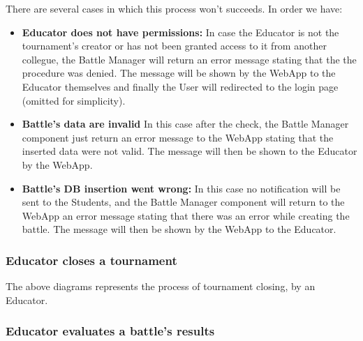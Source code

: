 \documentclass{article}
\begin{document}
{        There are several cases in which this process won't succeeds. In order we have:
        \begin{itemize}
            \item \textbf{Educator does not have permissions:} In case the Educator is not the 
            tournament's creator or has not been granted access to it from another collegue, 
            the Battle Manager will return an error message stating that the the procedure was 
            denied. 
            The message will be shown by the WebApp to the Educator themselves and finally
            the User will redirected to the login page (omitted for simplicity).
            \item \textbf{Battle's data are invalid} In this case after the check, the Battle 
            Manager component just return an error message to the WebApp stating that the 
            inserted data were not valid. The message will then be shown to the Educator by 
            the WebApp.
            \item \textbf{Battle's DB insertion went wrong:} In this case no 
            notification will be sent to the Students, and the Battle Manager component will 
            return to the WebApp an error message stating that there was an error while 
            creating the battle.
            The message will then be shown by the WebApp to the Educator.
        \end{itemize}


    \subsubsection{Educator closes a tournament}
        \begin{figure}[H]
            \centering
            \caption{}
            \label{fig:}
        \end{figure}

        The above diagrams represents the process of tournament closing, by an Educator. \\
    \subsubsection{Educator evaluates a battle's results}
        \begin{figure}[H]
            \centering
            \caption{}
            \label{fig:}
        \end{figure}
}
\end{document}
